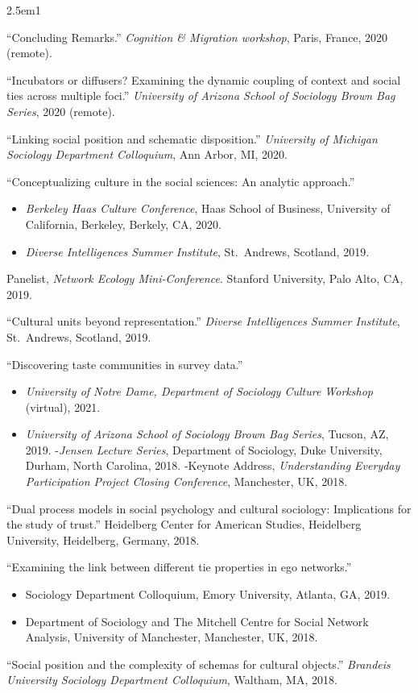 \documentclass[
]{article}
\providecommand{\tightlist}{%
  \setlength{\itemsep}{0pt}\setlength{\parskip}{0pt}}
\newenvironment{cventry}{\begin{hangparas}{2.5em}{1}}{\end{hangparas}}
\begin{document}
\begin{cventry}

``Concluding Remarks.'' \emph{Cognition \& Migration workshop}, Paris,
France, 2020 (remote).

``Incubators or diffusers? Examining the dynamic coupling of context and
social ties across multiple foci.'' \emph{University of Arizona School
of Sociology Brown Bag Series}, 2020 (remote).

``Linking social position and schematic disposition.'' \emph{University
of Michigan Sociology Department Colloquium}, Ann Arbor, MI, 2020.

``Conceptualizing culture in the social sciences: An analytic
approach.''

\begin{itemize}
\tightlist
\item
  \emph{Berkeley Haas Culture Conference}, Haas School of Business,
  University of California, Berkeley, Berkely, CA, 2020.
\item
  \emph{Diverse Intelligences Summer Institute}, St.~Andrews, Scotland,
  2019.
\end{itemize}

Panelist, \emph{Network Ecology Mini-Conference}. Stanford University,
Palo Alto, CA, 2019.

``Cultural units beyond representation.'' \emph{Diverse Intelligences
Summer Institute}, St.~Andrews, Scotland, 2019.

``Discovering taste communities in survey data.''

\begin{itemize}
\tightlist
\item
  \emph{University of Notre Dame, Department of Sociology Culture
  Workshop} (virtual), 2021.
\item
  \emph{University of Arizona School of Sociology Brown Bag Series},
  Tucson, AZ, 2019. -\emph{Jensen Lecture Series}, Department of
  Sociology, Duke University, Durham, North Carolina, 2018. -Keynote
  Address, \emph{Understanding Everyday Participation Project Closing
  Conference}, Manchester, UK, 2018.
\end{itemize}

``Dual process models in social psychology and cultural sociology:
Implications for the study of trust.'' Heidelberg Center for American
Studies, Heidelberg University, Heidelberg, Germany, 2018.

``Examining the link between different tie properties in ego networks.''

\begin{itemize}
\tightlist
\item
  Sociology Department Colloquium, Emory University, Atlanta, GA, 2019.
\item
  Department of Sociology and The Mitchell Centre for Social Network
  Analysis, University of Manchester, Manchester, UK, 2018.
\end{itemize}

``Social position and the complexity of schemas for cultural objects.''
\emph{Brandeis University Sociology Department Colloquium}, Waltham, MA,
2018.

\end{cventry}
\end{document}
